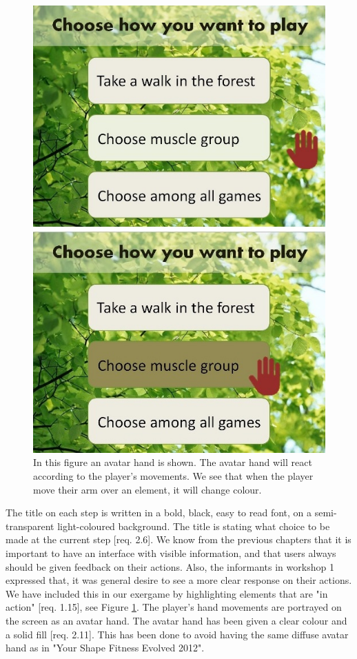 \begin{figure} [H]
\centering
\includegraphics[scale=0.4]{menuAction.jpg}
\caption[Menu - Action and response]{In this figure an avatar hand is shown. The avatar hand will react according to the player's movements. We see that when the player move their arm over an element, it will change colour.}
\label{fig:avatarAction}
\end{figure} 

The title on each step is written in a bold, black, easy to read font, on a semi-transparent light-coloured background. The title is stating what choice to be made at the current step [req. 2.6]. We know from the previous chapters that it is important to have an interface with visible information, and that users always should be given feedback on their actions. Also, the informants in workshop 1 expressed that, it was general desire to see a more clear response on their actions. We have included this in our exergame by highlighting elements that are "in action" [req. 1.15], see Figure \ref{fig:avatarAction}. The player's hand movements are portrayed on the screen as an avatar hand. The avatar hand has been given a clear colour and a solid fill [req. 2.11]. This has been done to avoid having the same diffuse avatar hand as in "Your Shape Fitness Evolved 2012".  

